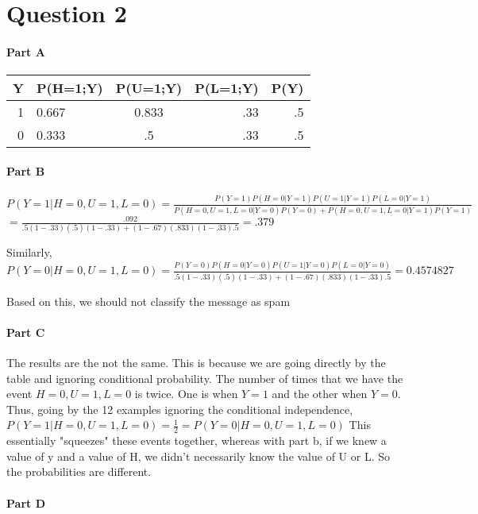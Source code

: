 \documentclass[11pt]{article}
\begin{document}
    \section{Question 2}\label{question-2}

    \paragraph{Part A}\label{part-a}

\begin{longtable}[]{@{}rlcrr@{}}
\toprule
Y & P(H=1;Y) & P(U=1;Y) & P(L=1;Y) & P(Y)\tabularnewline
\midrule
\endhead
1 & 0.667 & 0.833 & .33 & .5\tabularnewline
0 & 0.333 & .5 & .33 & .5\tabularnewline
\bottomrule
\end{longtable}

    \paragraph{Part B}\label{part-b}

\(P(Y=1|H=0, U=1, L=0) = \frac{P(Y=1)P(H=0|Y=1)P(U=1|Y=1)P(L=0|Y=1)}{P(H=0, U=1, L=0|Y=0)P(Y=0) + P(H=0, U=1, L=0|Y=1)P(Y=1)}\)
\(= \frac{.092} {.5(1-.33)(.5)(1-.33) + (1-.67)(.833)(1-.33).5} = .379\)

Similarly,
\(P(Y=0|H=0, U=1, L=0) = \frac{P(Y=0)P(H=0|Y=0)P(U=1|Y=0)P(L=0|Y=0)} {.5(1-.33)(.5)(1-.33) + (1-.67)(.833)(1-.33).5} = 0.4574827\)

Based on this, we should not classify the message as spam

    \paragraph{Part C}\label{part-c}

The results are the not the same. This is because we are going directly
by the table and ignoring conditional probability. The number of times
that we have the event \(H=0, U=1, L=0\) is twice. One is when \(Y=1\)
and the other when \(Y=0\). Thus, going by the 12 examples ignoring the
conditional independence,
\(P(Y=1|H=0, U=1, L=0) = \frac{1}{2} = P(Y=0|H=0, U=1, L=0)\) This
essentially "squeezes" these events together, whereas with part b, if we
knew a value of y and a value of H, we didn't necessarily know the value
of U or L. So the probabilities are different.

    \paragraph{Part D}\label{part-d}
\end{document}
